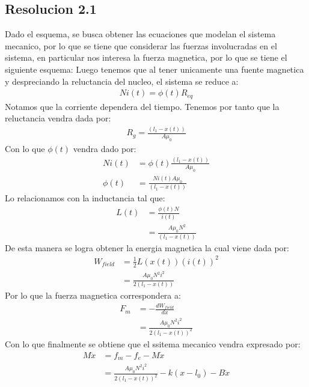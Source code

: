 \documentclass[
  11pt,
  letterpaper,
   addpoints,
   answers
  ]{exam}
\begin{document}
\begin{questions}
\begin{solution}
\subsection*{Resolucion 2.1}
   Dado el esquema, se busca obtener las ecuaciones que modelan el sistema mecanico, por lo que se tiene que considerar las fuerzas involucradas en el sistema, en particular nos interesa la fuerza magnetica, por lo que se tiene el siguiente esquema:
   Luego tenemos que al tener unicamente una fuente magnetica y despreciando la reluctancia del nucleo, el sistema se reduce a:
   \begin{align}
     Ni(t) = \phi(t)R_{eq}
   \end{align}
   Notamos que la corriente dependera del tiempo. Tenemos por tanto que la reluctancia vendra dada por:
    \begin{align}
      R_{g} = \frac{(l_{1}-x(t))}{A \mu_{0}}
    \end{align}
    Con lo que $\phi(t)$ vendra dado por:
    \begin{align}
        Ni(t) &= \phi(t) \frac{(l_{1}-x(t))}{A \mu_{0}}\\
        \phi(t) &= \frac{Ni(t)A\mu_{0}}{(l_{1}-x(t))}
    \end{align}
    Lo relacionamos con la inductancia tal que:
    \begin{align}
        L(t) &= \frac{\phi(t)N}{i(t)}\\
             &= \frac{A\mu_{0}N^{2}}{(l_{1}-x(t))}
    \end{align}
    De esta manera se logra obtener la energia magnetica la cual viene dada por:
    \begin{align}
        W_{field} &= \frac{1}{2}L(x(t))(i(t))^{2}\\
                 &= \frac{A\mu_{0}N^{2}i^{2}}{2(l_{1}-x(t))}
    \end{align}
    Por lo que la fuerza magnetica correspondera a:
    \begin{align}
        F_{m} &= -\frac{dW_{field}}{dx}\\
              &= \frac{A\mu_{0}N^{2}i^{2}}{2(l_{1}-x(t))^{2}}
    \end{align}
    Con lo que finalmente se obtiene que el ssitema mecanico vendra expresado por:
    \begin{align}
        M\ddot{x} &= f_{m} - f_{e} - M\dot{x}\\
                  &=\frac{A\mu_{0}N^{2}i^{2}}{2(l_{1}-x(t))^{2}} - k(x-l_{0}) - B\dot{x}
    \end{align}

\end{solution}
\end{questions}
\end{document}
